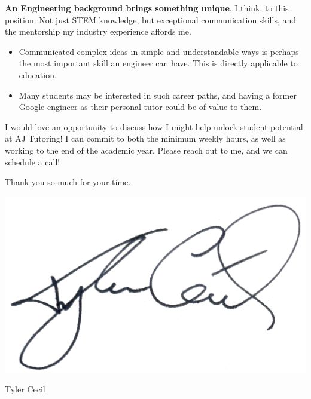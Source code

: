 \documentclass[sans, a4paper, 11pt]{article}
\newcommand{\cvcolor}[1]{{\color{MidnightBlue}#1}}
\renewcommand{\hl}[1]{\cvcolor{\textbf{#1}}}
\begin{document}
\begin{adjustwidth}{40pt}{40pt}
  \hl{An Engineering background brings something unique}, I think, to this
  position. Not just STEM knowledge, but exceptional communication skills, and
  the mentorship my industry experience affords me.
  \smallskip

  \begin{itemize}
    \item Communicated complex ideas in simple and understandable ways is
      perhaps the most important skill an engineer can have. This is directly
      applicable to education.
    \item Many students may be interested in such career paths, and having a
      former Google engineer as their personal tutor could be of value to them.
  \end{itemize}
  \medskip

  I would love an opportunity to discuss how I might help unlock student
  potential at AJ Tutoring! I can commit to both the minimum weekly hours, as
  well as working to the end of the academic year. Please reach out to me, and
  we can schedule a call!
  \bigskip

  Thank you so much for your time.

  \vspace{-.5em}
  \includegraphics[height=4.5\baselineskip]{sig}
  \vspace{-.5em}

  Tyler Cecil

\end{adjustwidth}
\end{document}
